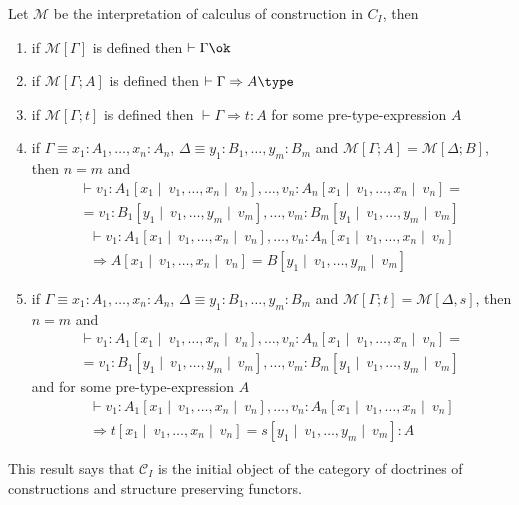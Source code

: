 \begin{theorem} 
    Let $\mathcal{M}$ be the interpretation of calculus of construction in $C_I$, then 
    \begin{enumerate}
        \item if $\mathcal{M}[\Gamma]$ is defined then $\vdash \Gamma \ok$
        \item if $\mathcal{M}[\Gamma ; A]$ is defined then $\vdash \Gamma \Rightarrow A \type$
        \item if $\mathcal{M}[\Gamma; t]$ is defined then $\vdash \Gamma \Rightarrow t \colon A$ for some pre-type-expression $A$
        \item if $\Gamma \equiv x_1 \colon A_1, \dots, x_n \colon A_n$, $\Delta \equiv y_1 \colon B_1, \dots, y_m \colon B_m$
              and $\mathcal{M}[\Gamma; A] = \mathcal{M}[\Delta; B]$, then $n = m$ and 
              \begin{multline*}
                \vdash 
                    v_1 \colon A_1 [x_1 \mid\ v_1, \dots, x_n \mid\ v_n], \dots, v_n \colon A_n[x_1 \mid\ v_1, \dots, x_n \mid\ v_n]
                = \\ =
                    v_1 \colon B_1 [y_1 \mid\ v_1, \dots, y_m \mid\ v_m], \dots, v_m \colon B_m[y_1 \mid\ v_1, \dots, y_m \mid\ v_m]
              \end{multline*}
              \begin{multline*}
                \vdash
                    v_1 \colon A_1 [x_1 \mid\ v_1, \dots, x_n \mid\ v_n], \dots, v_n \colon A_n[x_1 \mid\ v_1, \dots, x_n \mid\ v_n] \\
                \Rightarrow
                    A[x_1 \mid\ v_1, \dots, x_n \mid\ v_n] = B[y_1 \mid\ v_1, \dots, y_m \mid\ v_m]
              \end{multline*}
        \item if $\Gamma \equiv x_1 \colon A_1, \dots, x_n \colon A_n$, $\Delta \equiv y_1 \colon B_1, \dots, y_m \colon B_m$
              and $\mathcal{M}[\Gamma; t] = \mathcal{M}[\Delta, s]$, then $n = m$ and
              \begin{multline*}
                \vdash 
                    v_1 \colon A_1 [x_1 \mid\ v_1, \dots, x_n \mid\ v_n], \dots, v_n \colon A_n[x_1 \mid\ v_1, \dots, x_n \mid\ v_n]
                = \\ =
                    v_1 \colon B_1 [y_1 \mid\ v_1, \dots, y_m \mid\ v_m], \dots, v_m \colon B_m[y_1 \mid\ v_1, \dots, y_m \mid\ v_m]
              \end{multline*}
              and for some pre-type-expression $A$
              \begin{multline*}
                \vdash
                    v_1 \colon A_1 [x_1 \mid\ v_1, \dots, x_n \mid\ v_n], \dots, v_n \colon A_n[x_1 \mid\ v_1, \dots, x_n \mid\ v_n] \\
                \Rightarrow
                    t[x_1 \mid\ v_1, \dots, x_n \mid\ v_n] = s[y_1 \mid\ v_1, \dots, y_m \mid\ v_m] : A
              \end{multline*}
    \end{enumerate}
\end{theorem}

This result says that $\mathcal{C}_I$ is the initial object of the category of doctrines of constructions and 
structure preserving functors.